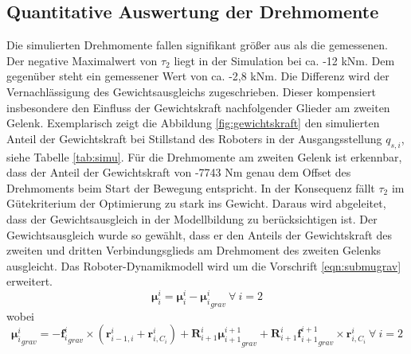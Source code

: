 \subsection*{Quantitative Auswertung der Drehmomente}
Die simulierten Drehmomente fallen signifikant größer aus als die gemessenen. Der negative Maximalwert von $\tau_2$ liegt in der Simulation bei ca. -12 kNm. Dem gegenüber steht ein gemessener Wert  von ca. -2,8 kNm. Die Differenz wird der Vernachlässigung des Gewichtsausgleichs zugeschrieben. Dieser kompensiert insbesondere den Einfluss der Gewichtskraft nachfolgender Glieder am zweiten Gelenk. Exemplarisch zeigt die Abbildung \ref{fig:gewichtskraft} den simulierten Anteil der Gewichtskraft bei Stillstand des Roboters in der Ausgangsstellung $q_{s,i}$, siehe Tabelle \ref{tab:simu}. Für die Drehmomente am zweiten Gelenk ist erkennbar, dass der Anteil der Gewichtskraft von -7743 Nm genau dem  Offset des Drehmoments beim Start der Bewegung entspricht. In der Konsequenz fällt $\tau_2$ im Gütekriterium der Optimierung zu stark ins Gewicht. Daraus wird abgeleitet, dass der Gewichtsausgleich in der Modellbildung zu berücksichtigen ist. 
%
Der Gewichtsausgleich wurde so gewählt, dass er den Anteils der Gewichtskraft des zweiten und dritten Verbindungsglieds am Drehmoment des zweiten Gelenks ausgleicht. 
Das Roboter-Dynamikmodell wird um die Vorschrift \ref{eqn:submugrav} erweitert.
%
\begin{equation}
	\label{eqn:submugrav}
\bm{\mu}^{i}_{i} = \bm{\mu}^{i}_{i} - {\bm{\mu}^{i}_{i}}_{grav} ~\forall ~i = 2
\end{equation}
%
wobei
%
\begin{equation}
	\label{eqn:mugrav}
	{\bm{\mu}^{i}_{i}}_{grav} = -{\bm{f}^{i}_{i}}_{grav} \times \left( \bm{r}^{i}_{i-1,i} + \bm{r}^{i}_{i,C_i} \right) + \bm{R}^{i}_{i+1} {\bm{\mu}^{i+1}_{i+1}}_{grav} + \bm{R}^{i}_{i+1} {\bm{f}^{i+1}_{i+1}}_{grav} \times \bm{r}^{i}_{i,C_i} ~\forall ~i = 2
\end{equation}
